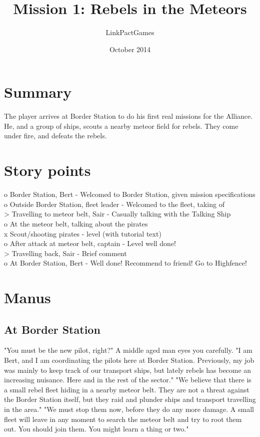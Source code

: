 \documentclass[a4paper,12pt]{article}
\begin{document}
\title{Mission 1: Rebels in the Meteors}
\author{LinkPactGames}
\date{October 2014}
\maketitle

\section{Summary}
The player arrives at Border Station to do his first real missions
for the Alliance. He, and a group of ships, scouts a nearby meteor field
for rebels. They come under fire, and defeats the rebels.

\section{Story points}

o Border Station, Bert - Welcomed to Border Station, given mission specifications\\
o Outside Border Station, fleet leader - Welcomed to the fleet, taking of\\
> Travelling to meteor belt, Sair - Casually talking with the Talking Ship\\
o At the meteor belt, talking about the pirates\\
x Scout/shooting pirates - level (with tutorial text)\\
o After attack at meteor belt, captain - Level well done!\\
> Travelling back, Sair - Brief comment\\
o At Border Station, Bert - Well done! Recommend to friend! Go to Highfence!\\

\section{Manus}

\subsection{At Border Station}

"You must be the new pilot, right?" A middle aged man eyes you carefully.
"I am Bert, and I am coordinating the pilots here at Border Station.
Previously, my job was mainly to keep track of our transport ships, but lately
rebels has become an increasing nuisance. Here and in the rest of the sector."
"We believe that there is a small rebel fleet hiding in a nearby meteor belt.
They are not a threat against the Border Station itself, but they raid and plunder ships
and transport travelling in the area."
"We must stop them now, before they do any more damage. A small fleet will leave in any
moment to search the meteor belt and try to root them out. You should join them.
You might learn a thing or two."
\end{document}
